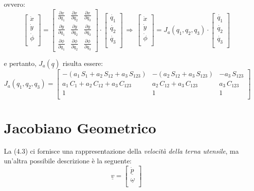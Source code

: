 ovvero:
\begin{equation}
	\begin{bmatrix}
		\dot{x} \\
		\dot{y} \\
		\dot{\phi} \\
	\end{bmatrix}
	= 
	\begin{bmatrix}
		\frac{\partial x}{\partial q_1} & \frac{\partial x}{\partial q_2} & \frac{\partial x}{\partial q_3} \\
		\frac{\partial y}{\partial q_1} & \frac{\partial y}{\partial q_2} & \frac{\partial y}{\partial q_3} \\
		\frac{\partial \phi}{\partial q_1} & \frac{\partial \phi}{\partial q_2} & \frac{\partial \phi}{\partial q_3}
	\end{bmatrix}
	\cdot
	\begin{bmatrix}
		\dot{q_1} \\
		\dot{q_2} \\
		\dot{q_3} \\
	\end{bmatrix}
	\,\Rightarrow\,
	\begin{bmatrix}
		\dot{x} \\
		\dot{y} \\
		\dot{\phi} \\
	\end{bmatrix}
	= 
	J_a(q_1, q_2, q_3) \cdot
	\begin{bmatrix}
		\dot{q_1} \\
		\dot{q_2} \\
		\dot{q_3} \\
	\end{bmatrix}
\end{equation}

e pertanto, $J_a(\underline{q})$ risulta essere:
\begin{equation*}
	J_a(q_1, q_2, q_3) = 
	\begin{bmatrix}
		-(a_1\,S_1 + a_2\,S_{12} + a_3\,S_{123}) & -(a_2\,S_{12} + a_3\,S_{123}) & -a_3\,S_{123} \\
		a_1\,C_1 + a_2\,C_{12} + a_3\,C_{123} & a_2\,C_{12} + a_3\,C_{123} & a_3\,C_{123} \\
		1 & 1 & 1 \\
	\end{bmatrix}
\end{equation*}

\section{Jacobiano Geometrico}
La ($4.3$) ci fornisce una rappresentazione della \emph{velocità della terna utensile}, ma un'altra possibile descrizione è la seguente:
\begin{equation}
	\underline{v} = 
	\begin{bmatrix}
		\dot{\underline{p}} \\
		\underline{\omega} \\
	\end{bmatrix}
\end{equation}

